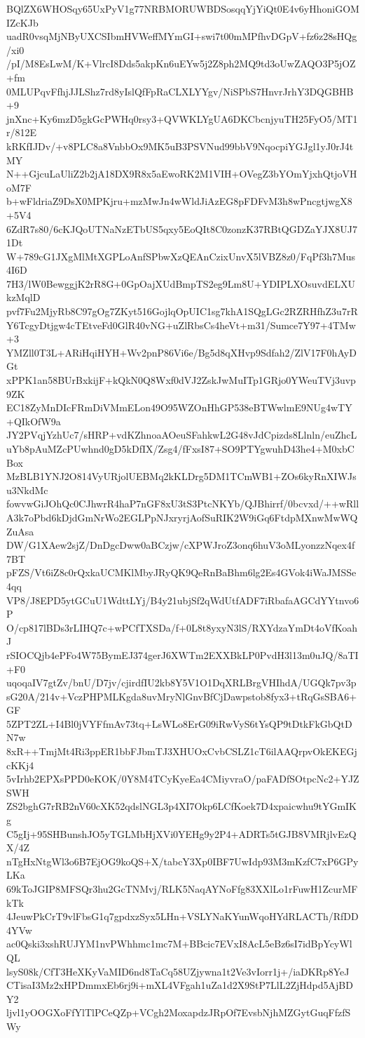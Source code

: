 BQlZX6WHOSqy65UxPyV1g77NRBMORUWBDSosqqYjYiQt0E4v6yHhoniGOMIZcKJb
uadR0vsqMjNByUXCSIbmHVWeffMYmGI+swi7t00mMPfhvDGpV+fz6z28sHQg/xi0
/pI/M8EsLwM/K+VlrcI8Dds5akpKn6uEYw5j2Z8ph2MQ9td3oUwZAQO3P5jOZ+fm
0MLUPqvFfhjJJLShz7rd8yIslQfFpRaCLXLYYgv/NiSPbS7HnvrJrhY3DQGBHB+9
jnXnc+Ky6mzD5gkGcPWHq0rsy3+QVWKLYgUA6DKCbcnjyuTH25FyO5/MT1r/812E
kRKfIJDv/+v8PLC8a8VnbbOx9MK5uB3PSVNud99bbV9NqocpiYGJgl1yJ0rJ4tMY
N++GjcuLaUliZ2b2jA18DX9R8x5aEwoRK2M1VIH+OVegZ3bYOmYjxhQtjoVHoM7F
b+wFldriaZ9DsX0MPKjru+mzMwJn4wWldJiAzEG8pFDFvM3h8wPncgtjwgX8+5V4
6ZdR7s80/6cKJQoUTNaNzETbUS5qxy5EoQIt8C0zonzK37RBtQGDZaYJX8UJ71Dt
W+789cG1JXgMlMtXGPLoAnfSPbwXzQEAnCzixUnvX5lVBZ8z0/FqPf3h7Mus4I6D
7H3/lW0BewggjK2rR8G+0GpOajXUdBmpTS2eg9Lm8U+YDIPLXOsuvdELXUkzMqlD
pvf7Fu2MjyRb8C97gOg7ZKyt516GojlqOpUIC1sg7khA1SQgLGc2RZRHfhZ3u7rR
Y6TcgyDtjgw4cTEtveFd0GlR40vNG+uZlRbsCs4heVt+m31/Sumce7Y97+4TMw+3
YMZll0T3L+ARiHqiHYH+Wv2pnP86Vi6e/Bg5d8qXHvp9Sdfah2/ZlV17F0hAyDGt
xPPK1an58BUrBxkijF+kQkN0Q8Wxf0dVJ2ZskJwMuITp1GRjo0YWeuTVj3uvp9ZK
EC18ZyMnDIcFRmDiVMmELon49O95WZOnHhGP538eBTWwlmE9NUg4wTY+QIkOfW9a
JY2PVqjYzhUc7/sHRP+vdKZhnoaAOeuSFahkwL2G48vJdCpizds8Llnln/euZhcL
uYb8pAuMZcPUwhnd0gD5kDfIX/Zsg4/fFxsI87+SO9PTYgwuhD43he4+M0xbCBox
MzBLB1YNJ2O814VyURjolUEBMq2kKLDrg5DM1TCmWB1+ZOs6kyRnXIWJsu3NkdMc
fowvwGiJOhQc0CJhwrR4haP7nGF8xU3tS3PtcNKYb/QJBhirrf/0bcvxd/++wRll
A3k7oPbd6kDjdGmNrWo2EGLPpNJxryrjAofSuRIK2W9iGq6FtdpMXnwMwWQZuAsa
DW/G1XAew2sjZ/DnDgcDww0aBCzjw/cXPWJroZ3onq6huV3oMLyonzzNqex4f7BT
pFZS/Vt6iZ8c0rQxkaUCMKlMbyJRyQK9QeRnBaBhm6lg2Es4GVok4iWaJMSSe4qq
VP8/J8EPD5ytGCuU1WdttLYj/B4y21ubjSf2qWdUtfADF7iRbafaAGCdYYtnvo6P
O/cp817lBDs3rLIHQ7c+wPCfTXSDa/f+0L8t8yxyN3lS/RXYdzaYmDt4oVfKoahJ
rSIOCQjb4ePFo4W75BymEJ374gerJ6XWTm2EXXBkLP0PvdH3l13m0uJQ/8aTI+F0
uqoqaIV7gtZv/bnU/D7jv/cjirdfIU2kb8Y5V1O1DqXRLBrgVHIhdA/UGQk7pv3p
sG20A/214v+VczPHPMLKgda8uvMryNlGnvBfCjDawpstob8fyx3+tRqGsSBA6+GF
5ZPT2ZL+I4Bl0jVYFfmAv73tq+LsWLo8ErG09iRwVyS6tYsQP9tDtkFkGbQtDN7w
8xR++TmjMt4Ri3ppER1bbFJbmTJ3XHUOxCvbCSLZ1cT6ilAAQrpvOkEKEGjcKKj4
5vIrhb2EPXsPPD0eKOK/0Y8M4TCyKyeEa4CMiyvraO/paFADfSOtpcNc2+YJZSWH
ZS2bghG7rRB2nV60cXK52qdslNGL3p4XI7Okp6LCfKoek7D4xpaicwhu9tYGmIKg
C5gIj+95SHBunshJO5yTGLMbHjXVi0YEHg9y2P4+ADRTs5tGJB8VMRjlvEzQX/4Z
nTgHxNtgWl3o6B7EjOG9koQS+X/tabcY3Xp0IBF7UwIdp93M3mKzfC7xP6GPyLKa
69kToJGIP8MFSQr3hu2GcTNMvj/RLK5NaqAYNoFfg83XXlLo1rFuwH1ZcurMFkTk
4JeuwPkCrT9vlFbsG1q7gpdxzSyx5LHn+VSLYNaKYunWqoHYdRLACTh/RfDD4YVw
ac0Qski3xshRUJYM1nvPWhhmc1mc7M+BBcic7EVxI8AcL5eBz6sI7idBpYcyWlQL
lsyS08k/CfT3HeXKyVaMID6nd8TaCq58UZjywna1t2Ve3vIorr1j+/iaDKRp8YeJ
CTisaI3Mz2xHPDmmxEb6rj9i+mXL4VFgah1uZa1d2X9StP7LlL2ZjHdpd5AjBDY2
ljvl1yOOGXoFfYlTlPCeQZp+VCgh2MoxapdzJRpOf7EvsbNjhMZGytGuqFfzfSWy
